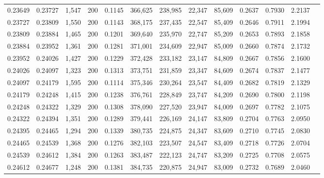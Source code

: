 \begin{tabular}{rrrrrrrrrrrrr}
0.23649 & 0.23727 &  1,547 & 200 &                                     0.1145 & 366,625 & 238,985 &  22,347 &  85,609 & 0.2637 & 0.7930 & 2.2137 \\
0.23727 & 0.23809 &  1,550 & 200 &                                     0.1143 & 368,175 & 237,435 &  22,547 &  85,409 & 0.2646 & 0.7911 & 2.1994 \\
0.23809 & 0.23884 &  1,465 & 200 &                                     0.1201 & 369,640 & 235,970 &  22,747 &  85,209 & 0.2653 & 0.7893 & 2.1858 \\
0.23884 & 0.23952 &  1,361 & 200 &                                     0.1281 & 371,001 & 234,609 &  22,947 &  85,009 & 0.2660 & 0.7874 & 2.1732 \\
0.23952 & 0.24026 &  1,427 & 200 &                                     0.1229 & 372,428 & 233,182 &  23,147 &  84,809 & 0.2667 & 0.7856 & 2.1600 \\
0.24026 & 0.24097 &  1,323 & 200 &                                     0.1313 & 373,751 & 231,859 &  23,347 &  84,609 & 0.2674 & 0.7837 & 2.1477 \\
0.24097 & 0.24179 &  1,595 & 200 &                                     0.1114 & 375,346 & 230,264 &  23,547 &  84,409 & 0.2682 & 0.7819 & 2.1329 \\
0.24179 & 0.24248 &  1,415 & 200 &                                     0.1238 & 376,761 & 228,849 &  23,747 &  84,209 & 0.2690 & 0.7800 & 2.1198 \\
0.24248 & 0.24322 &  1,329 & 200 &                                     0.1308 & 378,090 & 227,520 &  23,947 &  84,009 & 0.2697 & 0.7782 & 2.1075 \\
0.24322 & 0.24394 &  1,351 & 200 &                                     0.1289 & 379,441 & 226,169 &  24,147 &  83,809 & 0.2704 & 0.7763 & 2.0950 \\
0.24395 & 0.24465 &  1,294 & 200 &                                     0.1339 & 380,735 & 224,875 &  24,347 &  83,609 & 0.2710 & 0.7745 & 2.0830 \\
0.24465 & 0.24539 &  1,368 & 200 &                                     0.1276 & 382,103 & 223,507 &  24,547 &  83,409 & 0.2718 & 0.7726 & 2.0704 \\
0.24539 & 0.24612 &  1,384 & 200 &                                     0.1263 & 383,487 & 222,123 &  24,747 &  83,209 & 0.2725 & 0.7708 & 2.0575 \\
0.24612 & 0.24677 &  1,248 & 200 &                                     0.1381 & 384,735 & 220,875 &  24,947 &  83,009 & 0.2732 & 0.7689 & 2.0460 \\

\end{tabular}
